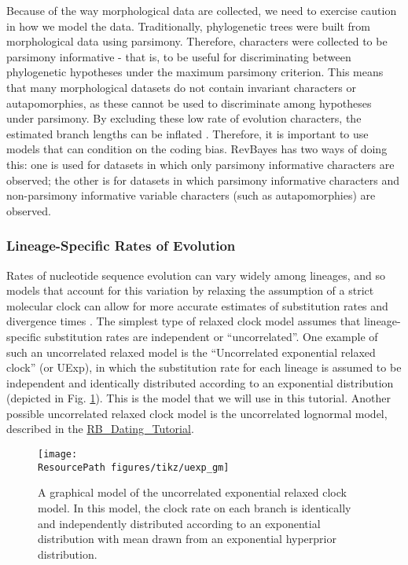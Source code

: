 Because of the way morphological data are collected, we need to exercise caution in how we model the data. 
Traditionally, phylogenetic trees were built from morphological data using parsimony. 
Therefore, characters were collected to be parsimony informative - that is, to be useful for discriminating between phylogenetic hypotheses under the maximum parsimony criterion.
This means that many morphological datasets do not contain invariant characters or autapomorphies, as these cannot be used to discriminate among hypotheses under parsimony. 
By excluding these low rate of evolution characters, the estimated branch lengths can be inflated \citep{Felsenstein1992,Lewis2001}.
Therefore, it is important to use models that can condition on the coding bias. 
RevBayes has two ways of doing this: one is used for datasets in which only parsimony informative characters are observed; the other is for datasets in which parsimony informative characters and non-parsimony informative variable characters (such as autapomorphies) are observed. \par


\subsubsection{Lineage-Specific Rates of Evolution}\label{subsub:Intro-UExp}

Rates of nucleotide sequence evolution can vary widely among lineages, and so models that account for this variation by relaxing the assumption of a strict molecular clock can allow for more accurate estimates of substitution rates and divergence times \citep{Drummond2006}.
The simplest type of relaxed clock model assumes that lineage-specific substitution rates are independent or ``uncorrelated''.
One example of such an uncorrelated relaxed model is the ``Uncorrelated exponential relaxed clock'' (or UExp), in which the substitution rate for each lineage is assumed to be independent and identically distributed according to an exponential distribution (depicted in Fig. \ref{fig:uexp_gm}).
This is the model that we will use in this tutorial.
Another possible uncorrelated relaxed clock model is the uncorrelated lognormal model, described in the \href{https://github.com/revbayes/revbayes_tutorial/raw/master/tutorial_TeX/RB_Dating_Tutorial/RB_Dating_Tutorial.pdf}{RB\_Dating\_Tutorial}.
\begin{figure}[h!]
\centering
\texttt{[image: \\ResourcePath figures/tikz/uexp\_gm]}
\caption{\small A graphical model of the uncorrelated exponential relaxed clock model. In this model, the clock rate on each branch is identically and independently distributed according to an exponential distribution with mean drawn from an exponential hyperprior distribution. }
\label{fig:uexp_gm}
\end{figure}


